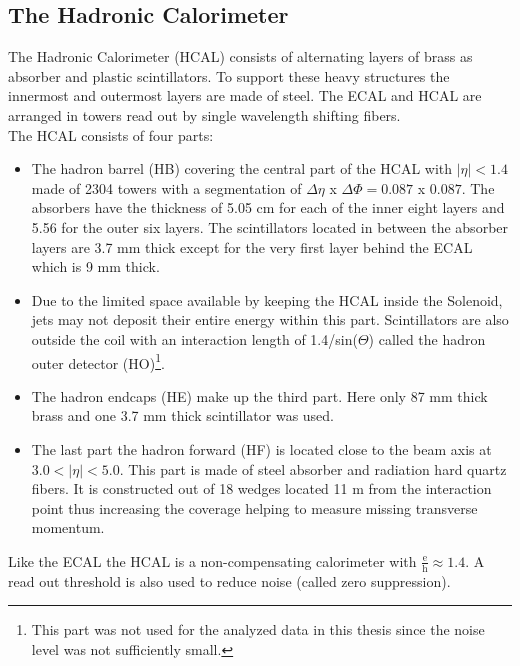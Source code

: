 \subsection{The Hadronic Calorimeter}
\label{sec:hcal}
The Hadronic Calorimeter (HCAL)\cite{Chatrchyan:2008zzk}\cite{bib:cmsptdr1}\cite{bib:cmstdr:hcal} consists of alternating layers of brass as absorber and plastic scintillators. To support these heavy structures the innermost and outermost layers are made of steel. The ECAL and HCAL are arranged in towers read out by single wavelength shifting fibers.\\
The HCAL consists of four parts:
\begin{itemize}
 \item The hadron barrel (HB) covering the central part of the HCAL with $|\eta| < 1.4$ made of 2304 towers with a segmentation of $\Delta \eta$ x $\Delta \Phi = 0.087$ x $0.087$. The absorbers have the thickness of 5.05 cm for each of the inner eight layers and 5.56 for the outer six layers. The scintillators located in between the absorber layers are 3.7 mm thick except for the very first layer behind the ECAL which is 9 mm thick. 
 \item Due to the limited space available by keeping the HCAL inside the Solenoid, jets may not deposit their entire energy within this part. Scintillators are also outside the coil with an interaction length of 1.4/sin($\Theta$) called the hadron outer detector (HO)\footnote{This part was not used for the analyzed data in this thesis since the noise level was not sufficiently small.}.
 \item The hadron endcaps (HE) make up the third part. Here only 87 mm thick brass and one 3.7 mm thick scintillator was used. 
 \item The last part the hadron forward (HF) is located close to the beam axis at   $3.0 <|\eta| < 5.0$. This part is made of steel absorber and radiation hard quartz fibers. It is constructed out of 18 wedges located 11 m from the interaction point thus increasing the coverage helping to measure missing transverse momentum.
\end{itemize}
Like the ECAL the HCAL is a non-compensating calorimeter with $\frac{\text{e}}{\text{h}}\approx 1.4$. A read out threshold is also used to reduce noise (called zero suppression).



\clearpage
